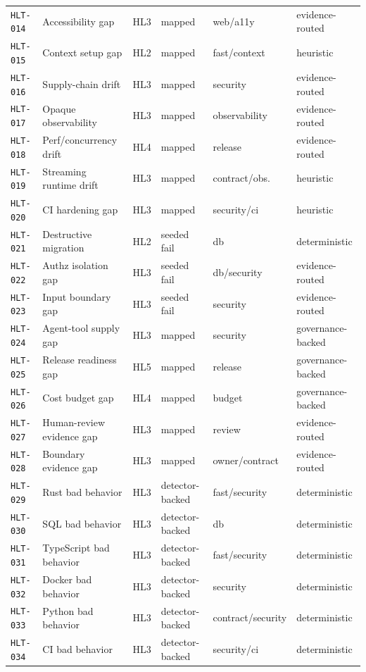 \begin{table}[t]
\begin{tabularx}{\textwidth}{L{0.17\textwidth} L{0.20\textwidth} L{0.10\textwidth} L{0.14\textwidth} L{0.15\textwidth} Y}
\texttt{HLT-014} & Accessibility gap & HL3 & mapped & web/a11y & evidence-routed \\
\texttt{HLT-015} & Context setup gap & HL2 & mapped & fast/context & heuristic \\
\texttt{HLT-016} & Supply-chain drift & HL3 & mapped & security & evidence-routed \\
\texttt{HLT-017} & Opaque observability & HL3 & mapped & observability & evidence-routed \\
\texttt{HLT-018} & Perf/concurrency drift & HL4 & mapped & release & evidence-routed \\
\texttt{HLT-019} & Streaming runtime drift & HL3 & mapped & contract/obs. & heuristic \\
\texttt{HLT-020} & CI hardening gap & HL3 & mapped & security/ci & heuristic \\
\texttt{HLT-021} & Destructive migration & HL2 & seeded fail & db & deterministic \\
\texttt{HLT-022} & Authz isolation gap & HL3 & seeded fail & db/security & evidence-routed \\
\texttt{HLT-023} & Input boundary gap & HL3 & seeded fail & security & evidence-routed \\
\texttt{HLT-024} & Agent-tool supply gap & HL3 & mapped & security & governance-backed \\
\texttt{HLT-025} & Release readiness gap & HL5 & mapped & release & governance-backed \\
\texttt{HLT-026} & Cost budget gap & HL4 & mapped & budget & governance-backed \\
\texttt{HLT-027} & Human-review evidence gap & HL3 & mapped & review & evidence-routed \\
\texttt{HLT-028} & Boundary evidence gap & HL3 & mapped & owner/contract & evidence-routed \\
\texttt{HLT-029} & Rust bad behavior & HL3 & detector-backed & fast/security & deterministic \\
\texttt{HLT-030} & SQL bad behavior & HL3 & detector-backed & db & deterministic \\
\texttt{HLT-031} & TypeScript bad behavior & HL3 & detector-backed & fast/security & deterministic \\
\texttt{HLT-032} & Docker bad behavior & HL3 & detector-backed & security & deterministic \\
\texttt{HLT-033} & Python bad behavior & HL3 & detector-backed & contract/security & deterministic \\
\texttt{HLT-034} & CI bad behavior & HL3 & detector-backed & security/ci & deterministic \\

\end{tabularx}
\end{table}
